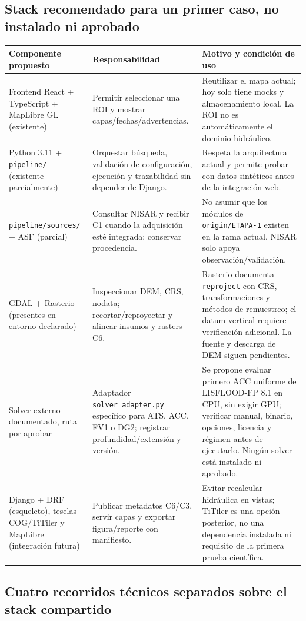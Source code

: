 \documentclass[11pt,a4paper]{article}
\begin{document}
\subsection{Stack recomendado para un primer caso, no instalado ni aprobado}
\begin{longtable}{p{}p{}p{}}
\toprule Componente propuesto & Responsabilidad & Motivo y condición de uso\\\midrule
Frontend React + TypeScript + MapLibre GL (existente) & Permitir seleccionar una ROI y mostrar capas/fechas/advertencias. & Reutilizar el mapa actual; hoy solo tiene mocks y almacenamiento local. La ROI no es automáticamente el dominio hidráulico.\\
Python 3.11 + \texttt{pipeline/} (existente parcialmente) & Orquestar búsqueda, validación de configuración, ejecución y trazabilidad sin depender de Django. & Respeta la arquitectura actual y permite probar con datos sintéticos antes de la integración web.\\
\texttt{pipeline/sources/} + ASF (parcial) & Consultar NISAR y recibir C1 cuando la adquisición esté integrada; conservar procedencia. & No asumir que los módulos de \texttt{origin/ETAPA-1} existen en la rama actual. NISAR solo apoya observación/validación.\\
GDAL + Rasterio (presentes en entorno declarado) & Inspeccionar DEM, CRS, nodata; recortar/reproyectar y alinear insumos y rasters C6. & Rasterio documenta \texttt{reproject} con CRS, transformaciones y métodos de remuestreo; el datum vertical requiere verificación adicional. La fuente y descarga de DEM siguen pendientes.\\
Solver externo documentado, ruta por aprobar & Adaptador \texttt{solver\_adapter.py} específico para ATS, ACC, FV1 o DG2; registrar profundidad/extensión y versión. & Se propone evaluar primero ACC uniforme de LISFLOOD-FP 8.1 en CPU, sin exigir GPU; verificar manual, binario, opciones, licencia y régimen antes de ejecutarlo. Ningún solver está instalado ni aprobado.\\
Django + DRF (esqueleto), teselas COG/TiTiler y MapLibre (integración futura) & Publicar metadatos C6/C3, servir capas y exportar figura/reporte con manifiesto. & Evitar recalcular hidráulica en vistas; TiTiler es una opción posterior, no una dependencia instalada ni requisito de la primera prueba científica.\\
\bottomrule
\end{longtable}
\subsection{Cuatro recorridos técnicos separados sobre el stack compartido}
\end{document}
